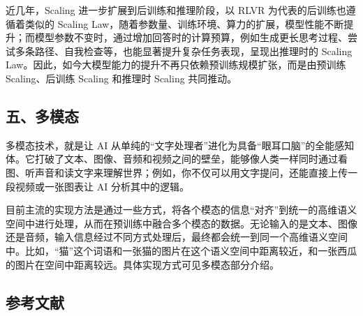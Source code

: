 近几年，Scaling 进一步扩展到后训练和推理阶段，以 RLVR 为代表的后训练也遵循着类似的 Scaling Law，随着参数量、训练环境、算力的扩展，模型性能不断提升；而模型参数不变时，通过增加回答时的计算预算，例如生成更长思考过程、尝试多条路径、自我检查等，也能显著提升复杂任务表现，呈现出推理时的 Scaling Law。因此，如今大模型能力的提升不再只依赖预训练规模扩张，而是由预训练 Scaling、后训练 Scaling 和推理时 Scaling 共同推动。

\hypertarget{ux4e94ux591aux6a21ux6001}{%
\subsection{五、多模态}\label{ux4e94ux591aux6a21ux6001}}

多模态技术，就是让 AI 从单纯的``文字处理者''进化为具备``眼耳口脑''的全能感知体。它打破了文本、图像、音频和视频之间的壁垒，能够像人类一样同时通过看图、听声音和读文字来理解世界；例如，你不仅可以用文字提问，还能直接上传一段视频或一张图表让 AI 分析其中的逻辑。

目前主流的实现方法是通过一些方式，将各个模态的信息``对齐''到统一的高维语义空间中进行处理，从而在预训练中融合多个模态的数据。无论输入的是文本、图像还是音频，输入信息经过不同方式处理后，最终都会统一到同一个高维语义空间中。比如，``猫''这个词语和一张猫的图片在这个语义空间中距离较近，和一张西瓜的图片在空间中距离较远。具体实现方式可见多模态部分介绍。

\FloatBarrier
{}
\hypertarget{ux53c2ux8003ux6587ux732e-73}{%
\subsection{参考文献}\label{ux53c2ux8003ux6587ux732e-73}}

